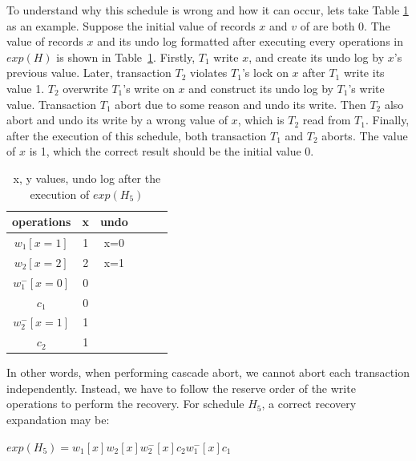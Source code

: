 \documentclass[conference]{IEEEtran}
\begin{document}
To understand why this schedule is wrong and how it can occur, lets take Table \ref{tbl:x_y_vlues} as an example.  
Suppose the initial value of records ${x}$ and ${v}$ of are both 0.
The value of records ${x}$  and its undo log formatted after executing every operations in $exp(H)$ is shown in Table~\ref{tbl:x_y_vlues}.
Firstly, ${T_1}$ write ${x}$, and create its undo log by ${x}$'s previous value.
Later, transaction ${T_2}$ violates ${T_1}$'s lock on ${x}$ after ${T_1}$ write its value 1.
 ${T_2}$ overwrite ${T_1}$'s write on ${x}$ and construct its undo log by ${T_1}$'s write value.
Transaction ${T_1}$ abort due to some reason and undo its write.
Then ${T_2}$ also abort and undo its write by a wrong value of ${x}$, which is ${T_2}$ read from ${T_1}$.
Finally, after the execution of this schedule, both transaction ${T_1}$ and ${T_2}$ aborts.
The value of ${x}$ is 1, which the correct result should be the initial value 0.


\begin{table}[htb]
  \centering
  \begin{tabular}{|c|c|c|c|c|c|}
  \hline
operations & x & undo   \\
  \hline
  \hline
  $w_1[x=1]$ & 1 & x=0  \\
  \hline
  $w_2[x=2]$ & 2  & x=1   \\
  \hline
  $w^-_1[x=0]$ & 0  &   \\
  \hline

  $c_1$ & 0  &   \\
  \hline
  $w^-_2[x=1]$ & 1  &    \\
  \hline
  $c_2$ & 1  &  \\
  \hline
  \end{tabular}
\caption{x, y values, undo log after the execution of ${exp(H_5)}$}
\label{tbl:x_y_vlues}
\end{table}

In other words, when performing cascade abort, we cannot abort each transaction independently.
Instead, we have to follow the reserve order of the write operations to perform the recovery.
For schedule ${H_5}$, a correct recovery expandation may be:
\begin{center}
  ${exp(H_5) =  w_1[x]w_2[x]w^-_2[x]c_2w^-_1[x]c_1}$
\end{center}
\end{document}
